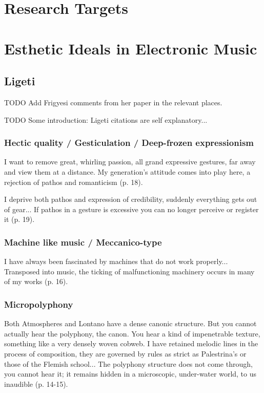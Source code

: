 \documentclass[a4paper,11pt]{article}
\begin{document}
\section{Research Targets}  %
\label{sec:research_targets}

\section{Esthetic Ideals in Electronic Music}
\label{sec:esthetic_ideals_in_Electronic_music}

\subsection{Ligeti}
\label{sub:eshtetic_ligeti}

TODO Add Frigyesi comments from her paper in the relevant places.

TODO Some introduction: Ligeti citations are self explanatory...

\subsubsection{Hectic quality / Gesticulation / Deep-frozen expressionism}
\label{subs:ligeti:hectic}

I want to remove great, whirling passion, all grand expressive gestures, far away and view them at a distance.
My generation's attitude comes into play here, a rejection of pathos and romanticism (p. 18).

I deprive both pathos and expression of credibility, suddenly everything gets out of gear...
If pathos in a gesture is excessive you can no longer perceive or register it (p. 19).

\subsubsection{Machine like music / Meccanico-type}
\label{subs:ligeti:machine}

I have always been fascinated by machines that do not work properly...
Transposed into music, the ticking of malfunctioning machinery occurs in many of my works (p. 16).

\subsubsection{Micropolyphony}
\label{subs:ligeti:micropolyphony}

Both Atmospheres and Lontano have a dense canonic structure.
But you cannot actually hear the polyphony, the canon.
You hear a kind of impenetrable texture, something like a very densely woven cobweb.
I have retained melodic lines in the process of composition, they are governed by rules as strict as Palestrina’s or those of the Flemish school...
The polyphony structure does not come through, you cannot hear it; it remains hidden in a microscopic, under-water world, to us inaudible (p. 14-15).
\end{document}
